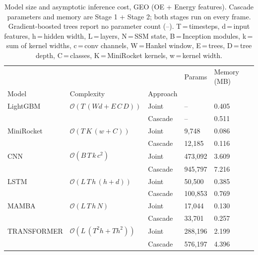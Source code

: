 \begin{table}
\centering
\caption{Model size and asymptotic inference cost, GEO (OE + Energy features). Cascade parameters and memory are Stage 1 + Stage 2; both stages run on every frame. Gradient-boosted trees report no parameter count (--). T\,=\,timesteps, d\,=\,input features, h\,=\,hidden width, L\,=\,layers, N\,=\,SSM state, B\,=\,Inception modules, k\,=\,sum of kernel widths, c\,=\,conv channels, W\,=\,Hankel window, E\,=\,trees, D\,=\,tree depth, C\,=\,classes, K\,=\,MiniRocket kernels, w\,=\,kernel width.}
\label{tab:complexity_geo}
\begin{tabular}{lllll}
\toprule
            &                                   &         &     Params & Memory (MB) \\
Model & Complexity & Approach &            &             \\
\midrule
LightGBM & $\mathcal{O}(T\,(W d + E\,C\,D))$ & Joint &         -- &       0.405 \\
            &                                   & Cascade &         -- &       0.511 \\
MiniRocket & $\mathcal{O}(T\,K\,(w + C))$ & Joint &    9{,}748 &       0.086 \\
            &                                   & Cascade &   12{,}185 &       0.116 \\
CNN & $\mathcal{O}(B\,T\,k\,c^2)$ & Joint &  473{,}092 &       3.609 \\
            &                                   & Cascade &  945{,}797 &       7.216 \\
LSTM & $\mathcal{O}(L\,T\,h\,(h+d))$ & Joint &   50{,}500 &       0.385 \\
            &                                   & Cascade &  100{,}853 &       0.769 \\
MAMBA & $\mathcal{O}(L\,T\,h\,N)$ & Joint &   17{,}044 &       0.130 \\
            &                                   & Cascade &   33{,}701 &       0.257 \\
TRANSFORMER & $\mathcal{O}(L\,(T^2 h + T h^2))$ & Joint &  288{,}196 &       2.199 \\
            &                                   & Cascade &  576{,}197 &       4.396 \\
\bottomrule
\end{tabular}
\end{table}
